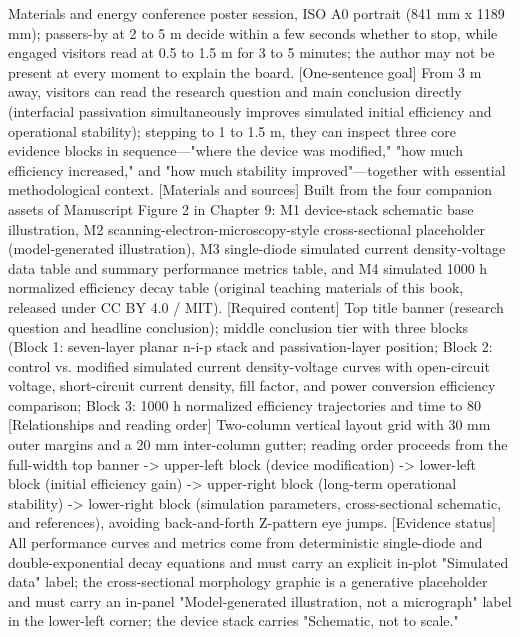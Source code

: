 \begin{Prompt}
 Materials and energy conference poster session, ISO A0 portrait (841 mm x 1189 mm); passers-by at 2 to 5 m decide within a few seconds whether to stop, while engaged visitors read at 0.5 to 1.5 m for 3 to 5 minutes; the author may not be present at every moment to explain the board.
[One-sentence goal] From 3 m away, visitors can read the research question and main conclusion directly (interfacial passivation simultaneously improves simulated initial efficiency and operational stability); stepping to 1 to 1.5 m, they can inspect three core evidence blocks in sequence---"where the device was modified," "how much efficiency increased," and "how much stability improved"---together with essential methodological context.
[Materials and sources] Built from the four companion assets of Manuscript Figure 2 in Chapter 9: M1 device-stack schematic base illustration, M2 scanning-electron-microscopy-style cross-sectional placeholder (model-generated illustration), M3 single-diode simulated current density-voltage data table and summary performance metrics table, and M4 simulated 1000 h normalized efficiency decay table (original teaching materials of this book, released under CC BY 4.0 / MIT).
[Required content] Top title banner (research question and headline conclusion); middle conclusion tier with three blocks (Block 1: seven-layer planar n-i-p stack and passivation-layer position; Block 2: control vs. modified simulated current density-voltage curves with open-circuit voltage, short-circuit current density, fill factor, and power conversion efficiency comparison; Block 3: 1000 h normalized efficiency trajectories and time to 80%
[Relationships and reading order] Two-column vertical layout grid with 30 mm outer margins and a 20 mm inter-column gutter; reading order proceeds from the full-width top banner -> upper-left block (device modification) -> lower-left block (initial efficiency gain) -> upper-right block (long-term operational stability) -> lower-right block (simulation parameters, cross-sectional schematic, and references), avoiding back-and-forth Z-pattern eye jumps.
[Evidence status] All performance curves and metrics come from deterministic single-diode and double-exponential decay equations and must carry an explicit in-plot "Simulated data" label; the cross-sectional morphology graphic is a generative placeholder and must carry an in-panel "Model-generated illustration, not a micrograph" label in the lower-left corner; the device stack carries "Schematic, not to scale."

\end{Prompt}
